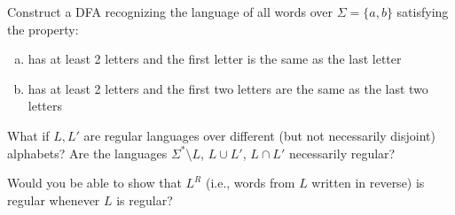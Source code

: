 \documentclass[a4paper,12pt]{amsart}
\begin{document}
\medskip\begin{problem}

    Construct a DFA recognizing the language of all words over $\Sigma=\{a,b\}$ satisfying the property:

    \medskip
    
    \begin{enumerate}[(a)]\setlength\itemsep{6pt}
        \item has at least 2 letters and the first letter is the same as the last letter
        \item has at least 2 letters and the first two letters are the same as the last two letters
    \end{enumerate}

\end{problem}


\medskip\begin{problem}

    What if $L,L'$ are regular languages over different (but not necessarily disjoint) alphabets? Are the languages $\Sigma^*\setminus L$, $L\cup L'$, $L\cap L'$ necessarily regular?

\end{problem}
  

\medskip\begin{problem}

    Would you be able to show that  $L^R$ (i.e., words from $L$ written in reverse) is regular whenever $L$ is regular?
      
\end{problem}
\end{document}
